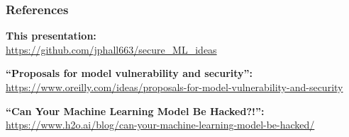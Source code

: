 \documentclass[11pt,
               aspectratio=169,
               hyperref={colorlinks}
               ]{beamer}
\begin{document}

	\begin{frame}[t, allowframebreaks]
	
		\frametitle{References}	
		
			\textbf{This presentation:}\\
			\footnotesize{\url{https://github.com/jphall663/secure_ML_ideas}}\normalsize
			
			\vspace{10pt}
		
			\textbf{``Proposals for model vulnerability and security'':}\\
			\footnotesize{\url{https://www.oreilly.com/ideas/proposals-for-model-vulnerability-and-security}}\normalsize
			
			\vspace{10pt}
			
			\textbf{``Can Your Machine Learning Model Be Hacked?!'':}\\
			\footnotesize{\url{https://www.h2o.ai/blog/can-your-machine-learning-model-be-hacked/}}
			
		
		\framebreak		
		
		\printbibliography
		
	\end{frame}
\end{document}
